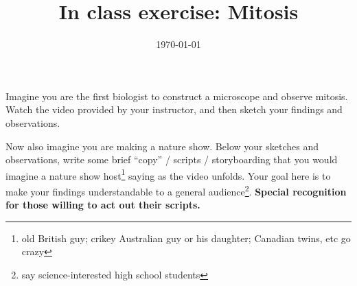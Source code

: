 \documentclass[hw,addpoints,noanswers]{exam}
\title{In class exercise: Mitosis}
\date{\today}
\author{\mobeardInstructorShort}
\begin{document}
\maketitle

\begin{questions}
\question[5] Imagine you are the first biologist to construct a microscope and observe mitosis. Watch the video provided by your instructor, and then sketch your findings and observations. 

\question[5] Now also imagine you are making a nature show. Below your sketches and observations, write some brief ``copy'' / scripts / storyboarding that you would imagine a nature show host\footnote{old British guy; crikey Australian guy or his daughter; Canadian twins, etc go crazy} saying as the video unfolds. Your goal here is to make your findings understandable to a general audience\footnote{say science-interested high school students}. \textbf{Special recognition for those willing to act out their scripts.}

\end{questions}
\end{document}

